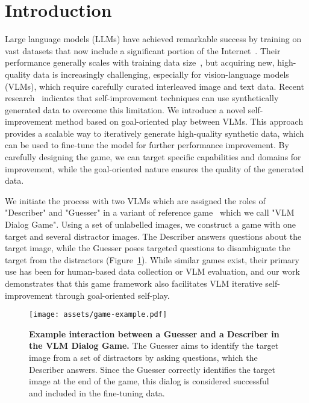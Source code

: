 \section{Introduction}
Large language models (LLMs) have achieved remarkable success by training on vast datasets that now include a significant portion of the Internet~\citep{achiam2023gpt, gemini2024}. 
Their performance generally scales with training data size~\citep{kaplan2020scaling}, but acquiring new, high-quality data is increasingly challenging, especially for vision-language models (VLMs), which require carefully curated interleaved image and text data.
Recent research~\citep{chen2024selfplay,bai2022constitutional, yuan2024selfrewarding, huang2022large} indicates that self-improvement techniques can use synthetically generated data to overcome this limitation.
We introduce a novel self-improvement method based on goal-oriented play between VLMs.
This approach provides a scalable way to iteratively generate high-quality synthetic data, which can be used to fine-tune the model for further performance improvement.
By carefully designing the game, we can target specific capabilities and domains for improvement, while the goal-oriented nature ensures the quality of the generated data.

We initiate the process with two VLMs which are assigned the roles of "Describer" and "Guesser" in a variant of reference game~\citep{krauss1964changes, das2017visual, de2017guesswhat, hakimov2024usinggameplayinvestigate} which we call "VLM Dialog Game".
Using a set of unlabelled images, we construct a game with one target and several distractor images. 
The Describer answers questions about the target image, while the Guesser poses targeted questions to disambiguate the target from the distractors (Figure~\ref{fig:game-example}). 
While similar games exist, their primary use has been for human-based data collection or VLM evaluation, and our work demonstrates that this game framework also facilitates VLM iterative self-improvement through goal-oriented self-play.

\begin{figure}[h]
    \centering
    \texttt{[image: assets/game-example.pdf]}
    \vspace{-8mm}
    \caption{\textbf{Example interaction between a Guesser and a Describer in the VLM Dialog Game.} The Guesser aims to identify the target image from a set of distractors by asking questions, which the Describer answers. Since the Guesser correctly identifies the target image at the end of the game, this dialog is considered successful and included in the fine-tuning data.}
    \vspace{-6mm}
    \label{fig:game-example}
\end{figure}

